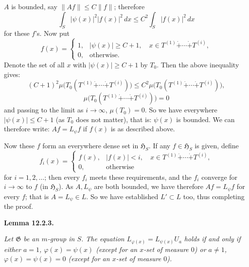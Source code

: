 \documentclass[12pt,b5paper,twoside]{article}
\newcommand{\Hspace}{\mathfrak H}
\newcommand{\Lemma}[1]{%
  \par\smallskip\noindent\phantomsection\label{lem:#1}\textbf{Lemma #1.}\enspace
}
\begin{document}
$A$ is bounded, say $\lVert Af\rVert\leq C\lVert f\rVert$; therefore
\[
 \int_S|\psi(x)|^2|f(x)|^2\,dx
 \leq C^2\int_S|f(x)|^2\,dx
\]
for these $f$'s. Now put
\[
 f(x)=\begin{cases}
  1,&|\psi(x)|\geq C+1,\quad
    x\in T^{(1)}\mathbin{\dot+}\cdots\mathbin{\dot+}T^{(i)},\\
  0,&\text{otherwise}.
 \end{cases}
\]
Denote the set of all $x$ with $|\psi(x)|\geq C+1$ by $T_0$. Then the above
inequality gives:
\[
 (C+1)^2\mu\bigl(T_0(T^{(1)}\mathbin{\dot+}\cdots
 \mathbin{\dot+}T^{(i)})\bigr)
 \leq C^2\mu\bigl(T_0(T^{(1)}\mathbin{\dot+}\cdots
 \mathbin{\dot+}T^{(i)})\bigr),
\]
\[
 \mu\bigl(T_0(T^{(1)}\mathbin{\dot+}\cdots
 \mathbin{\dot+}T^{(i)})\bigr)=0
\]
and passing to the limit as $i\to\infty$, $\mu(T_0)=0$. So we have everywhere
$|\psi(x)|\leq C+1$ (as $T_0$ does not matter), that is: $\psi(x)$ is
bounded. We can therefore write: $Af=L_\psi f$ if $f(x)$ is as described
above.

Now these $f$ form an everywhere dense set in $\Hspace_S$. If any
$f\in\Hspace_S$ is given, define
\[
 f_i(x)=\begin{cases}
  f(x),&|f(x)|<i,\quad
  x\in T^{(1)}\mathbin{\dot+}\cdots\mathbin{\dot+}T^{(i)},\\
  0,&\text{otherwise}
 \end{cases}
\]
for $i=1,2,\ldots$; then every $f_i$ meets these requirements, and the $f_i$
converge for $i\to\infty$ to $f$ (in $\Hspace_S$). As $A,L_\psi$ are both
bounded, we have therefore $Af=L_\psi f$ for every $f$; that is
$A=L_\psi\in L$. So we have established $L'\subset L$ too, thus completing
the proof.

\Lemma{12.2.3}
\emph{Let $\mathfrak G$ be an $m$-group in $S$. The equation
$L_{\varphi(x)}=L_{\psi(x)}U_a$ holds if and only if either $a=1$,
$\varphi(x)=\psi(x)$ (except for an $x$-set of measure $0$) or $a\neq1$,
$\varphi(x)=\psi(x)=0$ (except for an $x$-set of measure $0$).}
\end{document}
